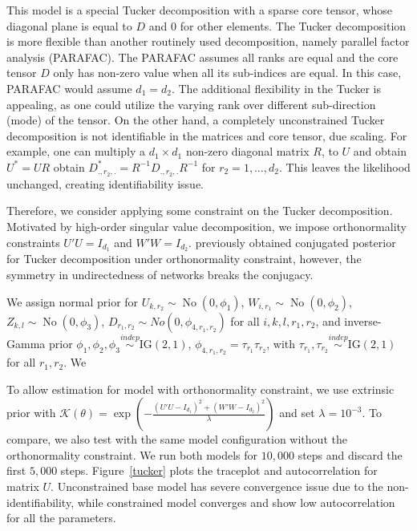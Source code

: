 \documentclass[10pt]{article}
\newcommand{\mc}[1]{\mathcal{#1}}
\DeclareMathOperator{\No}{No}
\DeclareMathOperator{\1}{\mathbbm{1}}
\begin{document}
   This model is a special Tucker decomposition with a sparse core tensor, whose diagonal plane is equal to $D$ and $0$ for other elements. The Tucker decomposition is more flexible than another routinely used decomposition, namely parallel factor analysis (PARAFAC). The PARAFAC assumes all ranks are equal and the core tensor $D$ only has non-zero value when all its sub-indices are equal. In this case, PARAFAC would assume $d_1=d_2$. The additional flexibility in the Tucker is appealing, as one could utilize the varying rank over different sub-direction (mode) of the tensor. On the other hand, a completely unconstrained Tucker decomposition is not identifiable in the matrices and core tensor, due scaling. For example, one can multiply a $d_1\times d_1$ non-zero diagonal matrix $R$, to $U$ and obtain $U^*=UR$ obtain $D^{*}_{.,r_2,.}=R^{-1}D_{.,r_2,.}R^{-1}$ for $r_2=1,\ldots,d_2$. This leaves the likelihood unchanged, creating identifiability issue. 

   Therefore, we consider applying some constraint on the Tucker decomposition. Motivated by high-order singular value decomposition, we impose orthonormality constraints $U'U=I_{d_1}$ and $W'W=I_{d_2}$. \cite{hoff2016equivariant} previously obtained conjugated posterior for Tucker decomposition under orthonormality constraint, however, the symmetry in undirectedness of networks breaks the conjugacy.

   We assign normal prior for $U_{k,r_2}\sim \No(0,\phi_{1})$, $W_{i,r_1}\sim \No(0,\phi_2)$, $Z_{k,l}\sim \No(0,\phi_3)$, $D_{r_1,r_2}\sim No(0, \phi_{4,r_1,r_2})$ for all $i,k,l,r_1,r_2$, and inverse-Gamma prior $\phi_1,\phi_2,\phi_3\stackrel{indep}{\sim} \text{IG}(2,1)$, $\phi_{4,r_1,r_2}= \tau_{r_1}\tau_{r_2}$, with $\tau_{r_1},\tau_{r_2}\stackrel{indep}{\sim} \text{IG}(2,1)$ for all $r_1,r_2$. We


To allow estimation for model with orthonormality constraint, we use extrinsic prior with $\mc K(\theta) = \exp( - \frac{(U'U-I_{d_1})^2 + (W'W-I_{d_2})^2  }{\lambda})$ and set $\lambda=10^{-3}$. To compare, we also test with the same model configuration without the orthonormality constraint. We run both models for $10,000$ steps and discard the first $5,000$ steps. Figure~\ref{tucker} plots the traceplot and autocorrelation for matrix $U$. Unconstrained base model has severe convergence issue due to the non-identifiability, while constrained model converges and show low autocorrelation for all the parameters.
\end{document}
